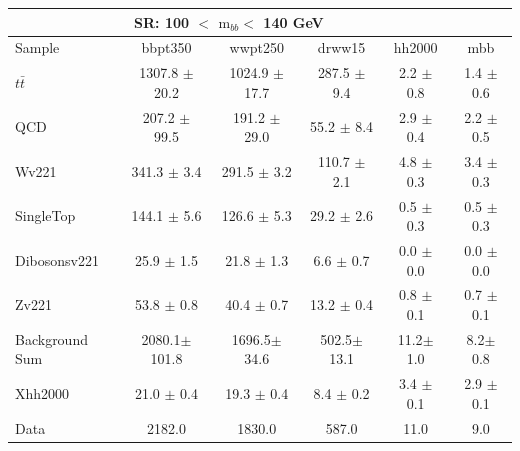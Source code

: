 \documentclass{beamer}
\newcommand*{\ttbar}{\ensuremath{t\bar{t}}\xspace}
\newcommand*{\mbb}{\ensuremath{\text{m}_{bb}}\xspace}
\newcommand*{\header}[1]{\fontsize{16}{8}\selectfont \textbf{{\color{MyPurple}{#1}}}}
\begin{document}
\begin{frame}
\begin{center}
\header{high-mass SR}
\end{center}
\begin{table}
\tiny
\begin{tabular}{l|c|c|c|c|c}
\hline\hline
\multicolumn{5}{c}{\textbf{SR}: 100 $<$ \mbb $<$ 140 GeV}\\\hline\hline
Sample  	& bbpt350 	& wwpt250 	& drww15 	& hh2000 	& mbb  \\\hline
\ttbar 	& 1307.8 $\pm$ 20.2 	& 1024.9 $\pm$ 17.7 	& 287.5 $\pm$ 9.4 	& 2.2 $\pm$ 0.8 	& 1.4 $\pm$ 0.6	\\\hline 
QCD 	& 207.2 $\pm$ 99.5 	& 191.2 $\pm$ 29.0 	& 55.2 $\pm$ 8.4 	& 2.9 $\pm$ 0.4 	& 2.2 $\pm$ 0.5	\\\hline 
Wv221 	& 341.3 $\pm$ 3.4 	& 291.5 $\pm$ 3.2 	& 110.7 $\pm$ 2.1 	& 4.8 $\pm$ 0.3 	& 3.4 $\pm$ 0.3	\\\hline 
SingleTop 	& 144.1 $\pm$ 5.6 	& 126.6 $\pm$ 5.3 	& 29.2 $\pm$ 2.6 	& 0.5 $\pm$ 0.3 	& 0.5 $\pm$ 0.3	\\\hline 
Dibosonsv221 	& 25.9 $\pm$ 1.5 	& 21.8 $\pm$ 1.3 	& 6.6 $\pm$ 0.7 	& 0.0 $\pm$ 0.0 	& 0.0 $\pm$ 0.0	\\\hline 
Zv221 	& 53.8 $\pm$ 0.8 	& 40.4 $\pm$ 0.7 	& 13.2 $\pm$ 0.4 	& 0.8 $\pm$ 0.1 	& 0.7 $\pm$ 0.1	\\\hline 
\hline
Background Sum 	& 2080.1$\pm$ 101.8 	& 1696.5$\pm$ 34.6 	& 502.5$\pm$ 13.1 	& 11.2$\pm$ 1.0 	& 8.2$\pm$ 0.8	\\\hline 
\hline
Xhh2000 	& 21.0 $\pm$ 0.4 	& 19.3 $\pm$ 0.4 	& 8.4 $\pm$ 0.2 	& 3.4 $\pm$ 0.1 	& 2.9 $\pm$ 0.1	\\\hline 
Data 	& 2182.0 	& 1830.0 	& 587.0 	& 11.0 	& 9.0	\\\hline
\end{tabular}
\end{table}
\end{frame}
\end{document}
